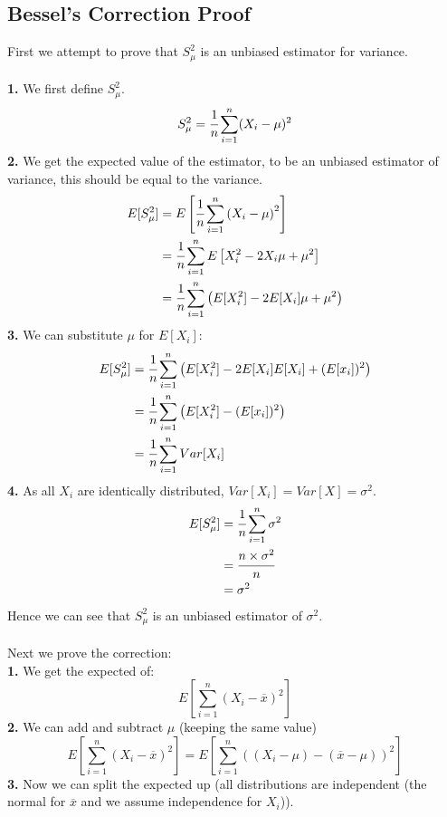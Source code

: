 \subsection{Bessel's Correction Proof}
First we attempt to prove that $S_\mu^2$ is an unbiased estimator for variance.
\\
\\ \textbf{1.} We first define $S_\mu^2$.
\[S_\mu^2 = \cfrac{1}{n}\sum_{i=1}^n(X_i - \mu)^2\]
\textbf{2. } We get the expected value of the estimator, to be an unbiased estimator of variance, this should be equal to the variance.
\[\begin{split}
		E[S_\mu^2] &= E\left[ \cfrac{1}{n} \sum_{i = 1}^n \left( X_i - \mu \right)^2 \right] \\
		&= \cfrac{1}{n}\sum_{i = 1}^n E\left[X_i^2 - 2X_i\mu + \mu^2 \right] \\
		&= \cfrac{1}{n}\sum_{i = 1}^n \left( E[X_i^2] - 2E[X_i]\mu + \mu^2 \right) \\
	\end{split}\]
\textbf{3. } We can substitute $\mu$ for $E[X_i]$:
\[\begin{split}
		E[S_\mu^2] &= \cfrac{1}{n}\sum_{i = 1}^n \left( E[X_i^2] - 2E[X_i]E[X_i] + (E[x_i])^2 \right) \\
		&= \cfrac{1}{n}\sum_{i = 1}^n \left( E[X_i^2] - (E[x_i])^2 \right) \\
		&= \cfrac{1}{n}\sum_{i = 1}^n Var[X_i] \\
	\end{split} \]
\textbf{4. } As all $X_i$ are identically distributed, $Var[X_i] = Var[X] = \sigma^2$.
\[\begin{split}
		E[S_\mu^2] &= \cfrac{1}{n}\sum_{i = 1}^n \sigma^2 \\
		&= \cfrac{n \times \sigma^2}{n} \\
		&= \sigma^2 \\
	\end{split}\]
Hence we can see that $S^2_\mu$ is an unbiased estimator of $\sigma^2$.
\\
\\ Next we prove the correction:
\\ \textbf{1. } We get the expected of:
\[E\left[ \sum_{i = 1}^n ( X_i - \overline{x} )^2 \right]\]
\textbf{2. } We can add and subtract $\mu$ (keeping the same value)
\[E\left[ \sum_{i = 1}^n ( X_i - \overline{x} )^2 \right] = E\left[ \sum_{i = 1}^n ( (X_i - \mu) - (\overline{x} - \mu) )^2 \right]\]
\textbf{3. } Now we can split the expected up (all distributions are independent (the normal for $\overline{x}$ and we assume independence for $X_i$)).
